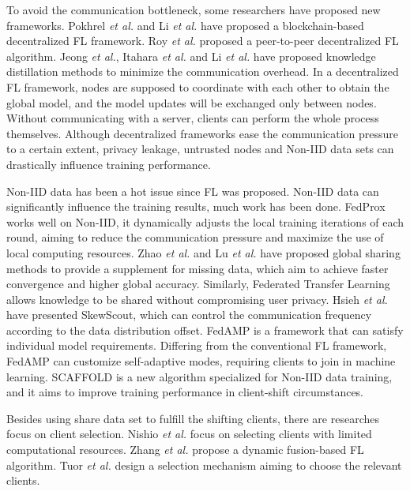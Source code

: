 \documentclass[conference]{IEEEtran}
\begin{document}
To avoid the communication bottleneck, some researchers have proposed new 
frameworks. Pokhrel \textit{et al.}\cite{9079513} and Li \textit{et al.}\cite{li2020blockchain} have 
proposed a blockchain-based decentralized FL framework. Roy \textit{et al.}\cite{roy2019braintorrent}
proposed a peer-to-peer decentralized FL algorithm. 
Jeong \textit{et al.}\cite{jeong2018federated}, Itahara \textit{et al.}\cite{itahara2020distillation} and Li \textit{et al.}\cite{li2019fedmd} have
proposed knowledge distillation methods to minimize the 
communication overhead. In a decentralized FL framework, 
nodes are supposed to coordinate with each other to obtain the global model, 
and the model updates will be exchanged only between nodes. Without communicating 
with a server, clients can perform the whole process themselves. Although 
decentralized frameworks ease the communication pressure to a certain extent, 
privacy leakage, untrusted nodes and Non-IID data sets can drastically influence training performance.

Non-IID data has been a hot issue since FL was proposed. Non-IID data 
can significantly influence the training results\cite{yang2019federated2}, much work has been done.
FedProx\cite{li2020federated} works well on Non-IID, it dynamically adjusts the local 
training iterations of each round, aiming to reduce the communication pressure
and maximize the use of local computing resources. Zhao \textit{et al.}\cite{zhao2018federated} and Lu \textit{et al.}\cite{8843900} have proposed
 global sharing methods to provide a supplement 
for missing data, which aim to achieve faster convergence and higher global accuracy. 
Similarly, Federated Transfer Learning\cite{9076003} allows knowledge to be shared without compromising user privacy. 
Hsieh \textit{et al.}\cite{hsieh2020non} have presented 
SkewScout, which can control the communication frequency according to the data 
distribution offset. FedAMP\cite{huang2021personalized} is a framework 
that can satisfy individual model requirements. Differing from the conventional FL 
framework, FedAMP can customize self-adaptive modes, requiring clients to 
join in machine learning. SCAFFOLD\cite{karimireddy2020scaffold} is a 
new algorithm specialized for Non-IID data training, and it aims 
to improve training performance in client-shift circumstances.

Besides using share data set to fulfill the shifting clients, there are researches
focus on client selection. Nishio \textit{et al.}\cite{nishio2019client} focus on selecting 
clients with limited computational resources. Zhang \textit{et al.}\cite{zhang2021dynamic} propose a dynamic
fusion-based FL algorithm. Tuor \textit{et al.}\cite{tuor2020data} design a 
selection mechanism aiming to choose the relevant clients.
\end{document}

